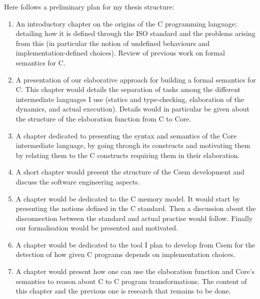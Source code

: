 \documentclass[11pt,a4paper, twocolumn]{article}
\begin{document}
Here follows a preliminary plan for my thesis structure:
\begin{enumerate} \itemsep0em 
\item An introductory chapter on the origins of the C programming
  language; detailing how it is defined through the ISO standard and
  the problems arising from this (in particular the notion of
  undefined behaviours and implementation-defined choices). Review of
  previous work on formal semantics for C.

\item A presentation of our elaborative approach for building a formal
  semantics for C. This chapter would details the separation of tasks
  among the different intermediate languages I use (statics and
  type-checking, elaboration of the dynamics, and actual
  execution). Details would in particular be given about the structure
  of the elaboration function from C to Core.

\item A chapter dedicated to presenting the syntax and semantics of
  the Core intermediate language, by going through its constructs and
  motivating them by relating them to the C constructs requiring them
  in their elaboration.

\item A short chapter would present the structure of the Csem
  development and discuss the software engineering aspects.

\item A chapter would be dedicated to the C memory model. It would
  start by presenting the notions defined in the C standard. Then a
  discussion about the disconnection between the standard and actual
  practise would follow. Finally our formalisation would be presented
  and motivated.

\item A chapter would be dedicated to the tool I plan to develop
  from Csem for the detection of how given C programs depends on
  implementation choices.

\item A chapter would present how one can use the elaboration function
  and Core's semantics to reason about C to C program
  transformations. The content of this chapter and the previous one is
  research that remains to be done.
\end{enumerate}
\end{document}
